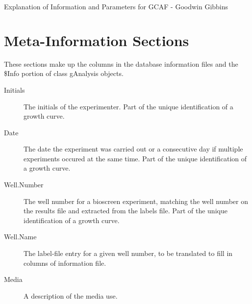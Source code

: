 \documentclass[11pt]{article}
\newcommand{\inlex}[1]{\ttfamily\small{#1}\rmfamily}
\begin{document}
 
\begin{center} \LARGE{Explanation of Information and Parameters for GCAF}\small{ - Goodwin Gibbins} \end{center}

 
\section{Meta-Information Sections}
These sections make up the columns in the database information files and the \inlex{\$Info} portion of class \inlex{gAnalysis} objects.


\begin{description}

\item[Initials] The initials of the experimenter. Part of the unique identification of a growth curve.

\item[Date] The date the experiment was carried out or a consecutive day if multiple experiments occured at the same time. Part of the unique identification of a growth curve.

\item[Well.Number] The well number for a bioscreen experiment, matching the well number on the results file and extracted from the labels file. Part of the unique identification of a growth curve.

\item[Well.Name] The label-file entry for a given well number, to be translated to fill in columns of information file.

\item[Media] A description of the media use.



\end{description}
\end{document}
